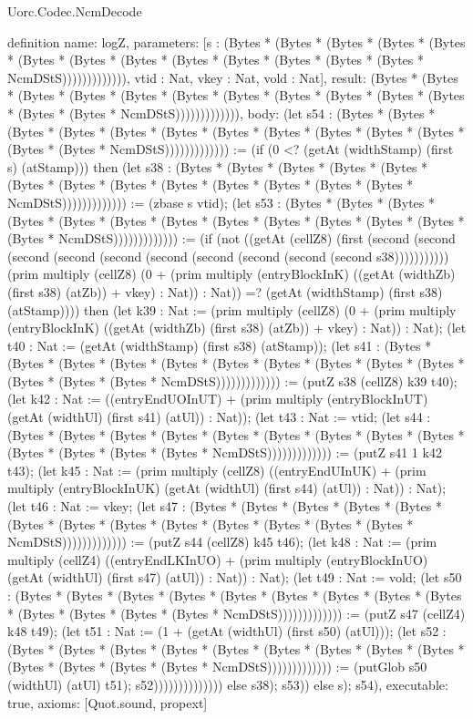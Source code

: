 \begin{lexlean}{Uorc.Codec.NcmDecode}
\begin{semanticmodule}
definition{
  name: logZ,
  parameters: [s : (Bytes * (Bytes * (Bytes * (Bytes * (Bytes * (Bytes * (Bytes * (Bytes * (Bytes * (Bytes * (Bytes * (Bytes * (Bytes * NcmDStS))))))))))))), vtid : Nat, vkey : Nat, vold : Nat],
  result: (Bytes * (Bytes * (Bytes * (Bytes * (Bytes * (Bytes * (Bytes * (Bytes * (Bytes * (Bytes * (Bytes * (Bytes * (Bytes * NcmDStS))))))))))))),
  body: (let s54 : (Bytes * (Bytes * (Bytes * (Bytes * (Bytes * (Bytes * (Bytes * (Bytes * (Bytes * (Bytes * (Bytes * (Bytes * (Bytes * NcmDStS))))))))))))) := (if (0 <? (getAt (widthStamp) (first s) (atStamp))) then (let s38 : (Bytes * (Bytes * (Bytes * (Bytes * (Bytes * (Bytes * (Bytes * (Bytes * (Bytes * (Bytes * (Bytes * (Bytes * (Bytes * NcmDStS))))))))))))) := (zbase s vtid); (let s53 : (Bytes * (Bytes * (Bytes * (Bytes * (Bytes * (Bytes * (Bytes * (Bytes * (Bytes * (Bytes * (Bytes * (Bytes * (Bytes * NcmDStS))))))))))))) := (if (not ((getAt (cellZ8) (first (second (second (second (second (second (second (second (second (second (second s38))))))))))) (prim multiply (cellZ8) (0 + (prim multiply (entryBlockInK) ((getAt (widthZb) (first s38) (atZb)) + vkey) : Nat)) : Nat)) =? (getAt (widthStamp) (first s38) (atStamp)))) then (let k39 : Nat := (prim multiply (cellZ8) (0 + (prim multiply (entryBlockInK) ((getAt (widthZb) (first s38) (atZb)) + vkey) : Nat)) : Nat); (let t40 : Nat := (getAt (widthStamp) (first s38) (atStamp)); (let s41 : (Bytes * (Bytes * (Bytes * (Bytes * (Bytes * (Bytes * (Bytes * (Bytes * (Bytes * (Bytes * (Bytes * (Bytes * (Bytes * NcmDStS))))))))))))) := (putZ s38 (cellZ8) k39 t40); (let k42 : Nat := ((entryEndUOInUT) + (prim multiply (entryBlockInUT) (getAt (widthUl) (first s41) (atUl)) : Nat)); (let t43 : Nat := vtid; (let s44 : (Bytes * (Bytes * (Bytes * (Bytes * (Bytes * (Bytes * (Bytes * (Bytes * (Bytes * (Bytes * (Bytes * (Bytes * (Bytes * NcmDStS))))))))))))) := (putZ s41 1 k42 t43); (let k45 : Nat := (prim multiply (cellZ8) ((entryEndUInUK) + (prim multiply (entryBlockInUK) (getAt (widthUl) (first s44) (atUl)) : Nat)) : Nat); (let t46 : Nat := vkey; (let s47 : (Bytes * (Bytes * (Bytes * (Bytes * (Bytes * (Bytes * (Bytes * (Bytes * (Bytes * (Bytes * (Bytes * (Bytes * (Bytes * NcmDStS))))))))))))) := (putZ s44 (cellZ8) k45 t46); (let k48 : Nat := (prim multiply (cellZ4) ((entryEndLKInUO) + (prim multiply (entryBlockInUO) (getAt (widthUl) (first s47) (atUl)) : Nat)) : Nat); (let t49 : Nat := vold; (let s50 : (Bytes * (Bytes * (Bytes * (Bytes * (Bytes * (Bytes * (Bytes * (Bytes * (Bytes * (Bytes * (Bytes * (Bytes * (Bytes * NcmDStS))))))))))))) := (putZ s47 (cellZ4) k48 t49); (let t51 : Nat := (1 + (getAt (widthUl) (first s50) (atUl))); (let s52 : (Bytes * (Bytes * (Bytes * (Bytes * (Bytes * (Bytes * (Bytes * (Bytes * (Bytes * (Bytes * (Bytes * (Bytes * (Bytes * NcmDStS))))))))))))) := (putGlob s50 (widthUl) (atUl) t51); s52)))))))))))))) else s38); s53)) else s); s54),
  executable: true,
  axioms: [Quot.sound, propext]
}


\end{semanticmodule}
\end{lexlean}
